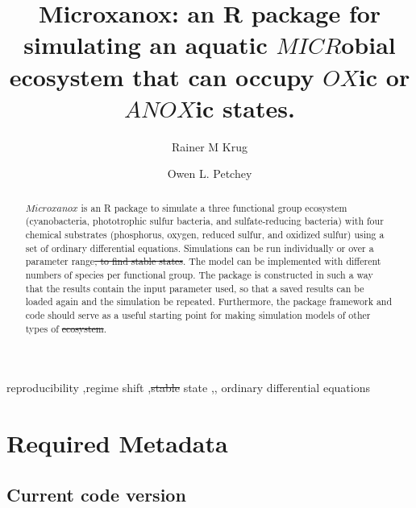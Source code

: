\documentclass[]{elsarticle} %
\providecommand{\DIFaddtex}[1]{{\protect\color{blue}\uwave{#1}}} %
\providecommand{\DIFdeltex}[1]{{\protect\color{red}\sout{#1}}}                      %
\providecommand{\DIFaddbegin}{} %
\providecommand{\DIFaddend}{} %
\providecommand{\DIFdelbegin}{} %
\providecommand{\DIFdelend}{} %
\providecommand{\DIFadd}[1]{\texorpdfstring{\DIFaddtex{#1}}{#1}} %
\providecommand{\DIFdel}[1]{\texorpdfstring{\DIFdeltex{#1}}{}} %
\newcommand{\DIFscaledelfig}{0.5}
\newlength{\DIFdelgraphicswidth} %
\newlength{\DIFdelgraphicsheight} %
\newcommand{\DIFaddincludegraphics}[2][]{{\color{blue}\fbox{\DIFOincludegraphics[#1]{#2}}}} %
\newcommand{\DIFdelincludegraphics}[2][]{%
\sbox{\DIFdelgraphicsbox}{\DIFOincludegraphics[#1]{#2}}%
\settoboxwidth{\DIFdelgraphicswidth}{\DIFdelgraphicsbox} %
\settoboxtotalheight{\DIFdelgraphicsheight}{\DIFdelgraphicsbox} %
\scalebox{\DIFscaledelfig}{%
\parbox[b]{\DIFdelgraphicswidth}{\usebox{\DIFdelgraphicsbox}\\[-\baselineskip] \rule{\DIFdelgraphicswidth}{0em}}\llap{\resizebox{\DIFdelgraphicswidth}{\DIFdelgraphicsheight}{%
\setlength{\unitlength}{\DIFdelgraphicswidth}%
\begin{picture}(1,1)%
\thicklines\linethickness{2pt} %
{\color[rgb]{1,0,0}\put(0,0){\framebox(1,1){}}}%
{\color[rgb]{1,0,0}\put(0,0){\line( 1,1){1}}}%
{\color[rgb]{1,0,0}\put(0,1){\line(1,-1){1}}}%
\end{picture}%
}\hspace*{3pt}}} %
} %
\DeclareRobustCommand{\DIFaddbegin}{\DIFOaddbegin \let\includegraphics\DIFaddincludegraphics} %
\DeclareRobustCommand{\DIFaddend}{\DIFOaddend \let\includegraphics\DIFOincludegraphics} %
\DeclareRobustCommand{\DIFdelbegin}{\DIFOdelbegin \let\includegraphics\DIFdelincludegraphics} %
\DeclareRobustCommand{\DIFdelend}{\DIFOaddend \let\includegraphics\DIFOincludegraphics} %
\begin{document}
\begin{frontmatter}

  \title{Microxanox: an R package for simulating an aquatic \(MICR\)obial ecosystem that can occupy \(OX\)ic or \(ANOX\)ic states.}
    \author[University of Zürich]{Rainer M Krug%
  }
    \author[University of Zürich]{Owen L. Petchey%
  }

  \begin{abstract}
  \(Microxanox\) is an R package to simulate a three functional group ecosystem (cyanobacteria, phototrophic sulfur bacteria, and sulfate-reducing bacteria) with four chemical substrates (phosphorus, oxygen, reduced sulfur, and oxidized sulfur) using a set of ordinary differential equations. Simulations can be run individually or over a parameter range\DIFdelbegin \DIFdel{, to find stable states}\DIFdelend . The model can be implemented with different numbers of species per functional group. The package is constructed in such a way that the results contain the input parameter used, so that a saved results can be loaded again and the simulation be repeated. Furthermore, the package framework and code should serve as a useful starting point for making simulation models of other types of \DIFdelbegin \DIFdel{ecosystem}\DIFdelend \DIFaddbegin \DIFadd{ecosystems}\DIFaddend .
  \end{abstract}
    \begin{keyword}
    reproducibility \sep regime shift \sep \DIFdelbegin \DIFdel{stable }\DIFdelend \DIFaddbegin \DIFadd{steady }\DIFaddend state \sep \DIFaddbegin \DIFadd{final state }\sep 
    \DIFaddend ordinary differential equations
  \end{keyword}

 \end{frontmatter}

\pagebreak

\hypertarget{required-metadata}{%
\section{Required Metadata}\label{required-metadata}}

\hypertarget{current-code-version}{%
\subsection{Current code version}\label{current-code-version}}
\end{document}
